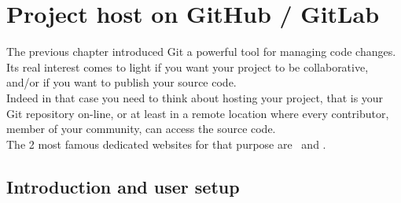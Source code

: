 \chapter{Project host on GitHub / GitLab}
\label{hosting}

The previous chapter introduced Git a powerful tool for managing code changes. \\
Its real interest comes to light if you want your project to be collaborative,  
and/or if you want to publish your source code. \\
Indeed in that case you need to think about hosting your project, that is your Git repository on-line, 
or at least in a remote location where every contributor, member of your community, can access the source code. \\
The 2 most famous dedicated websites for that purpose are \github\ and \gitlab.

\section{Introduction and user setup}

